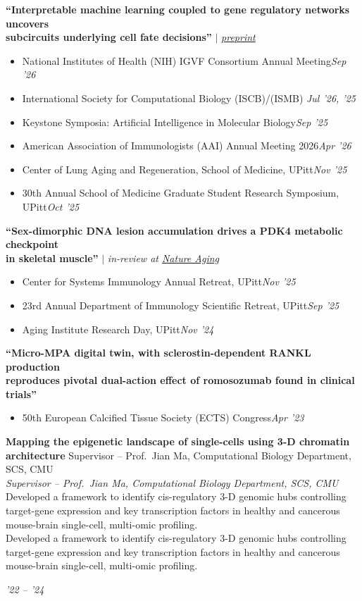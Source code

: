 \documentclass[11pt,letterpaper]{article}
\newlength{\cvlabelw}\setlength{\cvlabelw}{1.15in}   %
\newlength{\cvlabelsep}\setlength{\cvlabelsep}{0.15in}%
\newlength{\cvdatew}\setlength{\cvdatew}{1.15in}     %
\newcommand{\cvsection}[1]{%
  \par\addvspace{\baselineskip}\needspace{3\baselineskip}%
  \noindent\llap{\raisebox{0pt}[\height][0pt]{%
    \parbox[t]{\cvlabelw}{\raggedright\normalfont\scshape\bfseries
      \textcolor{sectionpurple}{#1}}}\hspace{\cvlabelsep}}%
  \nopagebreak\ignorespaces}
\newcommand{\dates}[1]{\hfill{\small\textsl{#1}}}
\newcommand{\expentry}[4]{%
  \parbox[t]{\dimexpr\linewidth-\cvdatew-\cvlabelsep\relax}{\raggedright
    \textbf{#1}%
    \ifx\relax#3\relax\else\\[1.5pt]\textsl{#3}\fi
    \ifx\relax#4\relax\else\\[2pt]#4\fi}%
  \hfill
  \parbox[t]{\cvdatew}{\raggedleft\small\textsl{#2}}%
  \par\addvspace{5pt}}
\begin{document}
\cvsection{Invited Talks}%
\textbf{``Interpretable machine learning coupled to gene regulatory networks uncovers \\ subcircuits underlying cell fate decisions''} $\mid$ \emph{\href{https://www.biorxiv.org/content/10.64898/2026.09.28.754797v1}{preprint}}
\begin{itemize}[label={},leftmargin=0pt]
  \item National Institutes of Health (NIH) IGVF Consortium Annual Meeting\dates{Sep '26}
  \item International Society for Computational Biology (ISCB)/(ISMB) \dates{Jul '26, '25}
  \item Keystone Symposia: Artificial Intelligence in Molecular Biology\dates{Sep '25}
  \item American Association of Immunologists (AAI) Annual Meeting 2026\dates{Apr '26}
  \item Center of Lung Aging and Regeneration, School of Medicine, UPitt\dates{Nov '25}
  \item 30th Annual School of Medicine Graduate Student Research Symposium, UPitt\dates{Oct '25}
\end{itemize}

\textbf{``Sex-dimorphic DNA lesion accumulation drives a PDK4 metabolic checkpoint \\ in skeletal muscle''} $\mid$ \emph{in-review at \href{https://www.nature.com/nataging}{Nature Aging}}
\begin{itemize}[label={},leftmargin=0pt]
  \item Center for Systems Immunology Annual Retreat, UPitt\dates{Nov '25}
  \item 23rd Annual Department of Immunology Scientific Retreat, UPitt\dates{Sep '25}
  \item Aging Institute Research Day, UPitt\dates{Nov '24}
\end{itemize}

\textbf{``Micro-MPA digital twin, with sclerostin-dependent RANKL production \\ reproduces pivotal dual-action effect of romosozumab found in clinical trials''}
\begin{itemize}[label={},leftmargin=0pt]
  \item 50th European Calcified Tissue Society (ECTS) Congress\dates{Apr '23}
\end{itemize}

\cvsection{Research Experience Prior to Thesis}%
\expentry{Mapping the epigenetic landscape of single-cells using 3-D chromatin architecture}{'22 -- '24}
  {Supervisor -- Prof.\ Jian Ma, Computational Biology Department, SCS, CMU}
  {Developed a framework to identify cis-regulatory 3-D genomic hubs controlling target-gene expression and key transcription factors in healthy and cancerous mouse-brain single-cell, multi-omic profiling.}
\end{document}
